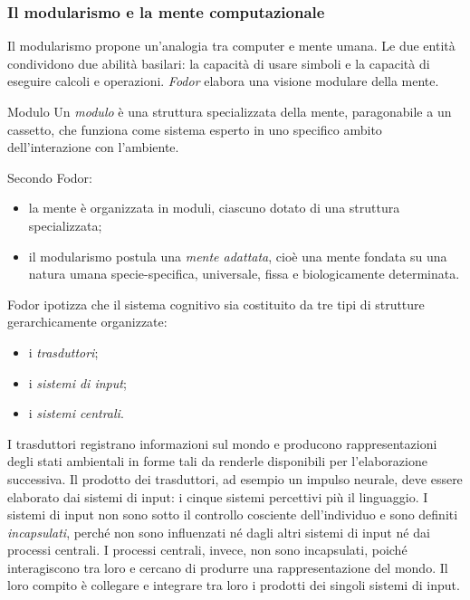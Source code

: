 \documentclass[a4paper]{article}
\begin{document}
\subsubsection{Il modularismo e la mente computazionale}
Il modularismo propone un'analogia tra computer e mente umana. Le due entità condividono due abilità basilari: la capacità di usare simboli e la capacità di eseguire calcoli e operazioni.
\emph{Fodor} elabora una visione modulare della mente.
\begin{snippetdefinition}{Modulo}
    Un \emph{modulo} è una struttura specializzata della mente, paragonabile a un cassetto, che funziona come sistema esperto in uno specifico ambito dell'interazione con l'ambiente.
\end{snippetdefinition}
Secondo Fodor:
\begin{itemize}
    \item la mente è organizzata in moduli, ciascuno dotato di una struttura specializzata;
    \item il modularismo postula una \emph{mente adattata}, cioè una mente fondata su una natura umana specie-specifica, universale, fissa e biologicamente determinata.
\end{itemize}
Fodor ipotizza che il sistema cognitivo sia costituito da tre tipi di strutture gerarchicamente organizzate:
\begin{itemize}
    \item i \emph{trasduttori};
    \item i \emph{sistemi di input};
    \item i \emph{sistemi centrali}.
\end{itemize}
I trasduttori registrano informazioni sul mondo e producono rappresentazioni degli stati ambientali in forme tali da renderle disponibili per l'elaborazione successiva. Il prodotto dei trasduttori, ad esempio un impulso neurale, deve essere elaborato dai sistemi di input: i cinque sistemi percettivi più il linguaggio.
I sistemi di input non sono sotto il controllo cosciente dell'individuo e sono definiti \emph{incapsulati}, perché non sono influenzati né dagli altri sistemi di input né dai processi centrali.
I processi centrali, invece, non sono incapsulati, poiché interagiscono tra loro e cercano di produrre una rappresentazione del mondo. Il loro compito è collegare e integrare tra loro i prodotti dei singoli sistemi di input.
\end{document}
